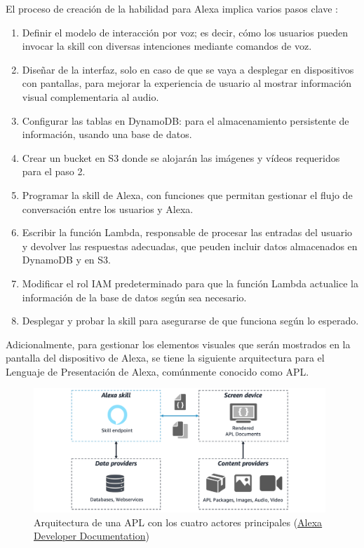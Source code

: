El proceso de creación de la habilidad para Alexa implica varios pasos clave \parencite{arquitecturaSkill}:
\begin{enumerate}
	\item Definir el modelo de interacción por voz; es decir, cómo los usuarios pueden invocar la skill con diversas intenciones mediante comandos de voz.
	\item Diseñar de la interfaz, solo en caso de que se vaya a desplegar en dispositivos con pantallas, para mejorar la experiencia de usuario al mostrar información visual complementaria al audio.
	\item Configurar las tablas en DynamoDB: para el almacenamiento persistente de información, usando una base de datos.
	\item Crear un bucket en S3 donde se alojarán las imágenes y vídeos requeridos para el paso 2.
	\item Programar la skill de Alexa, con funciones que permitan gestionar el flujo de conversación entre los usuarios y Alexa.
	\item Escribir la función Lambda, responsable de procesar las entradas del usuario y devolver las respuestas adecuadas, que peuden incluir datos almacenados en DynamoDB y en S3.
	\item Modificar el rol IAM predeterminado para que la función Lambda actualice la información de la base de datos según sea necesario.
	\item Desplegar y probar la skill para asegurarse de que funciona según lo esperado.
\end{enumerate}

Adicionalmente, para gestionar los elementos visuales que serán mostrados en la pantalla del dispositivo de Alexa, se tiene la siguiente arquitectura para el Lenguaje de Presentación de Alexa, comúnmente conocido como APL.

\begin{figure}[H]
	\centering
	\includegraphics[width=0.98\textwidth]{imgs/arquitectura-apl.png}
	\caption{Arquitectura de una APL con los cuatro actores principales (\href{https://developer.amazon.com/en-US/docs/alexa/alexa-presentation-language/apl-bp-understand-apl-architecture.html}{Alexa Developer Documentation})}
\label{fig:arquitectura-apl}
\end{figure}

